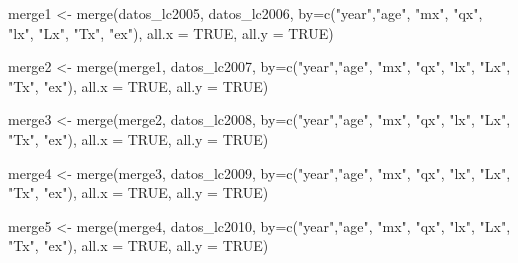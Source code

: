 \documentclass[
]{article}
\newenvironment{Shaded}{\begin{snugshade}}{\end{snugshade}}
\newcommand{\AttributeTok}[1]{\textcolor[rgb]{0.77,0.63,0.00}{#1}}
\newcommand{\ConstantTok}[1]{\textcolor[rgb]{0.00,0.00,0.00}{#1}}
\newcommand{\FunctionTok}[1]{\textcolor[rgb]{0.00,0.00,0.00}{#1}}
\newcommand{\NormalTok}[1]{#1}
\newcommand{\OtherTok}[1]{\textcolor[rgb]{0.56,0.35,0.01}{#1}}
\newcommand{\StringTok}[1]{\textcolor[rgb]{0.31,0.60,0.02}{#1}}
\begin{document}
\begin{Shaded}
\begin{Highlighting}[]
\NormalTok{merge1 }\OtherTok{\textless{}{-}} \FunctionTok{merge}\NormalTok{(datos\_lc2005, datos\_lc2006, }\AttributeTok{by=}\FunctionTok{c}\NormalTok{(}\StringTok{"year"}\NormalTok{,}\StringTok{"age"}\NormalTok{, }\StringTok{"mx"}\NormalTok{, }\StringTok{"qx"}\NormalTok{, }\StringTok{"lx"}\NormalTok{, }\StringTok{"Lx"}\NormalTok{, }\StringTok{"Tx"}\NormalTok{, }\StringTok{"ex"}\NormalTok{), }\AttributeTok{all.x =} \ConstantTok{TRUE}\NormalTok{, }\AttributeTok{all.y =} \ConstantTok{TRUE}\NormalTok{)}

\NormalTok{merge2 }\OtherTok{\textless{}{-}} \FunctionTok{merge}\NormalTok{(merge1, datos\_lc2007, }\AttributeTok{by=}\FunctionTok{c}\NormalTok{(}\StringTok{"year"}\NormalTok{,}\StringTok{"age"}\NormalTok{, }\StringTok{"mx"}\NormalTok{, }\StringTok{"qx"}\NormalTok{, }\StringTok{"lx"}\NormalTok{, }\StringTok{"Lx"}\NormalTok{, }\StringTok{"Tx"}\NormalTok{, }\StringTok{"ex"}\NormalTok{), }\AttributeTok{all.x =} \ConstantTok{TRUE}\NormalTok{, }\AttributeTok{all.y =} \ConstantTok{TRUE}\NormalTok{)}

\NormalTok{merge3 }\OtherTok{\textless{}{-}} \FunctionTok{merge}\NormalTok{(merge2, datos\_lc2008, }\AttributeTok{by=}\FunctionTok{c}\NormalTok{(}\StringTok{"year"}\NormalTok{,}\StringTok{"age"}\NormalTok{, }\StringTok{"mx"}\NormalTok{, }\StringTok{"qx"}\NormalTok{, }\StringTok{"lx"}\NormalTok{, }\StringTok{"Lx"}\NormalTok{, }\StringTok{"Tx"}\NormalTok{, }\StringTok{"ex"}\NormalTok{), }\AttributeTok{all.x =} \ConstantTok{TRUE}\NormalTok{, }\AttributeTok{all.y =} \ConstantTok{TRUE}\NormalTok{)}

\NormalTok{merge4 }\OtherTok{\textless{}{-}} \FunctionTok{merge}\NormalTok{(merge3, datos\_lc2009, }\AttributeTok{by=}\FunctionTok{c}\NormalTok{(}\StringTok{"year"}\NormalTok{,}\StringTok{"age"}\NormalTok{, }\StringTok{"mx"}\NormalTok{, }\StringTok{"qx"}\NormalTok{, }\StringTok{"lx"}\NormalTok{, }\StringTok{"Lx"}\NormalTok{, }\StringTok{"Tx"}\NormalTok{, }\StringTok{"ex"}\NormalTok{), }\AttributeTok{all.x =} \ConstantTok{TRUE}\NormalTok{, }\AttributeTok{all.y =} \ConstantTok{TRUE}\NormalTok{)}

\NormalTok{merge5 }\OtherTok{\textless{}{-}} \FunctionTok{merge}\NormalTok{(merge4, datos\_lc2010, }\AttributeTok{by=}\FunctionTok{c}\NormalTok{(}\StringTok{"year"}\NormalTok{,}\StringTok{"age"}\NormalTok{, }\StringTok{"mx"}\NormalTok{, }\StringTok{"qx"}\NormalTok{, }\StringTok{"lx"}\NormalTok{, }\StringTok{"Lx"}\NormalTok{, }\StringTok{"Tx"}\NormalTok{, }\StringTok{"ex"}\NormalTok{), }\AttributeTok{all.x =} \ConstantTok{TRUE}\NormalTok{, }\AttributeTok{all.y =} \ConstantTok{TRUE}\NormalTok{)}


\end{Highlighting}
\end{Shaded}
\end{document}
